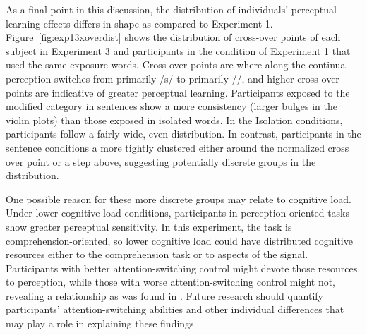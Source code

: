 As a final point in this discussion, the distribution of individuals' perceptual learning effects differs in shape as compared to Experiment 1. 
Figure~\ref{fig:exp13xoverdist} shows the distribution of cross-over points of each subject in Experiment 3 and participants in the condition of Experiment 1 that used the same exposure words.  
Cross-over points are where along the continua perception switches from primarily /s/ to primarily /\textesh/, and higher cross-over points are indicative of greater perceptual learning.
Participants exposed to the modified category in sentences show a more consistency (larger bulges in the violin plots) than those exposed in isolated words.
In the Isolation conditions, participants follow a fairly wide, even distribution.
In contrast, participants in the sentence conditions a more tightly clustered either around the normalized cross over point or a step above, suggesting potentially discrete groups in the distribution.

One possible reason for these more discrete groups may relate to cognitive load.
Under lower cognitive load conditions, participants in perception-oriented tasks show greater perceptual sensitivity.
In this experiment, the task is comprehension-oriented, so lower cognitive load could have distributed cognitive resources either to the comprehension task or to aspects of the signal.
Participants with better attention-switching control might devote those resources to perception, while those with worse attention-switching control might not, revealing a relationship as was found in \citet{Scharenborg2013}.
Future research should quantify participants' attention-switching abilities and other individual differences that may play a role in explaining these findings.



